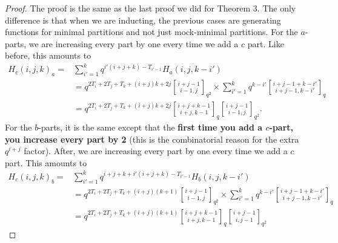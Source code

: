 \documentclass[10pt,a4paper]{amsart}
\begin{document}
\begin{proof}
The proof is the same as the last proof we did for Theorem 3. The only difference is that when we are inducting, the previous cases are generating functions for minimal partitions and not just mock-minimal partitions. For the $a$-parts, we are increasing every part by one every time we add a $c$ part. Like before, this amounts to 
\begin{align*}
    H_c(i,j,k)_{a}=&\sum_{i'=1}^k q^{i'(i+j+k)-T_{i'-1}}H_{a}(i,j,k-i')\\&=q^{2T_i+2T_j+T_k+(i+j)k+2j}{i+j-1\brack i-1,j}_{q^2}\times \sum_{i'=1}^kq^{k-i'}{i+j-1+k-i'\brack i+j-1,k-i'}_{q}\\
    &=q^{2T_i+2T_j+T_k+(i+j)k+2j}{i+j+k-1\brack i+j,k-1}_q{i+j-1\brack i-1,j}_{q^2}.
\end{align*}
For the $b$-parts, it is the same except that the \textbf{first time you add a $c$-part, you increase every part by 2} (this is the combinatorial reason for the extra $q^{i+j}$ factor). After, we are increasing every part by one every time we add a $c$ part. This amounts to 
\begin{align*}
    H_c(i,j,k)_{b}=& \sum_{i'=1}^k q^{i+j+k+i'(i+j+k)-T_{i'-1}}H_{b}(i,j,k-i')\\&=q^{2T_i+2T_j+T_k+(i+j)(k+1)}{i+j-1\brack i-1,j}_{q^2}\times \sum_{i'=1}^kq^{k-i'}{i+j-1+k-i'\brack i+j-1,k-i'}_{q}\\
    &=q^{2T_i+2T_j+T_k+(i+j)(k+1)}{i+j+k-1\brack i+j,k-1}_q{i+j-1\brack i,j-1}_{q^2}
\end{align*}
\end{proof}
\end{document}
